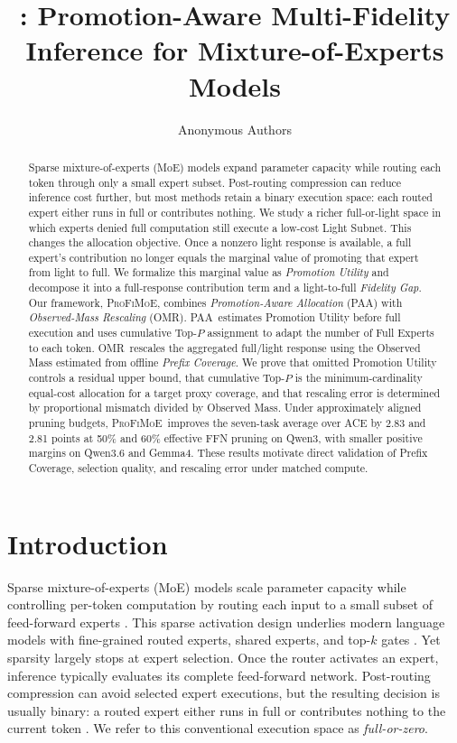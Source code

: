 \documentclass{article}
\title{\method: Promotion-Aware Multi-Fidelity\\Inference for Mixture-of-Experts Models}
\author{Anonymous Authors}
\newcommand{\PAA}{\textsc{PAA}}
\newcommand{\OMR}{\textsc{OMR}}
\newcommand{\method}{\textsc{ProFiMoE}}
\begin{document}
\maketitle

\begin{abstract}
Sparse mixture-of-experts (MoE) models expand parameter capacity while routing each token through only a small expert subset. Post-routing compression can reduce inference cost further, but most methods retain a binary execution space: each routed expert either runs in full or contributes nothing. We study a richer full-or-light space in which experts denied full computation still execute a low-cost Light Subnet. This changes the allocation objective. Once a nonzero light response is available, a full expert's contribution no longer equals the marginal value of promoting that expert from light to full. We formalize this marginal value as \emph{Promotion Utility} and decompose it into a full-response contribution term and a light-to-full \emph{Fidelity Gap}. Our framework, \method, combines \emph{Promotion-Aware Allocation} (\PAA) with \emph{Observed-Mass Rescaling} (\OMR). \PAA\ estimates Promotion Utility before full execution and uses cumulative Top-$P$ assignment to adapt the number of Full Experts to each token. \OMR\ rescales the aggregated full/light response using the Observed Mass estimated from offline \emph{Prefix Coverage}. We prove that omitted Promotion Utility controls a residual upper bound, that cumulative Top-$P$ is the minimum-cardinality equal-cost allocation for a target proxy coverage, and that rescaling error is determined by proportional mismatch divided by Observed Mass. Under approximately aligned pruning budgets, \method\ improves the seven-task average over ACE by 2.83 and 2.81 points at 50\% and 60\% effective FFN pruning on Qwen3, with smaller positive margins on Qwen3.6 and Gemma4. These results motivate direct validation of Prefix Coverage, selection quality, and rescaling error under matched compute.
\end{abstract}

\section{Introduction}
\label{sec:intro}

Sparse mixture-of-experts (MoE) models scale parameter capacity while controlling per-token computation by routing each input to a small subset of feed-forward experts \citep{shazeer2017outrageously,lepikhin2021gshard,fedus2022switch}. This sparse activation design underlies modern language models with fine-grained routed experts, shared experts, and top-$k$ gates \citep{dai2024deepseekmoe,jiang2024mixtral,yang2025qwen3,gemmateam2026gemma4}. Yet sparsity largely stops at expert selection. Once the router activates an expert, inference typically evaluates its complete feed-forward network. Post-routing compression can avoid selected expert executions, but the resulting decision is usually binary: a routed expert either runs in full or contributes nothing to the current token \citep{lu2024notall,huang2024harder,zhao2025adak,guo2025dynmoe,xie2024moepruner,lasby2025reap,liu2026aimer,liu2026allocmoe}. We refer to this conventional execution space as \emph{full-or-zero}.
\end{document}
